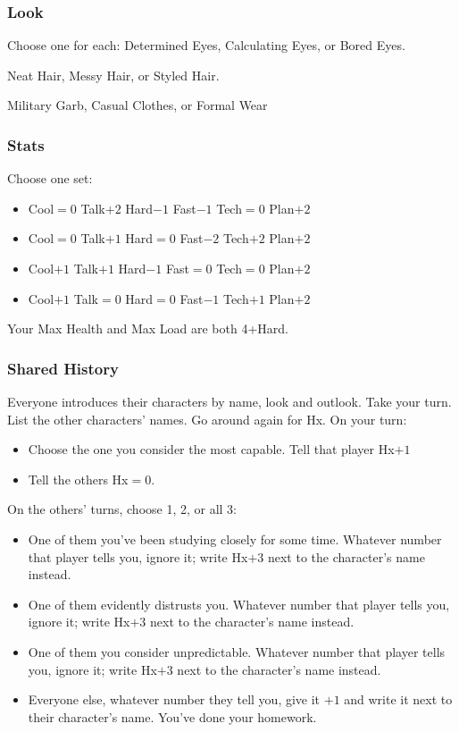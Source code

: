 \subsubsection{Look}
Choose one for each:
Determined Eyes, Calculating Eyes, or Bored Eyes.

Neat Hair, Messy Hair, or Styled Hair.

Military Garb, Casual Clothes, or Formal Wear

\subsubsection{Stats}
Choose one set:
\begin{itemize}
\setlength\itemsep{0em}
\item Cool${=}0$ Talk$+2$ Hard$-1$ Fast$-1$ Tech${=}0$ Plan$+2$
\item Cool${=}0$ Talk$+1$ Hard${=}0$ Fast$-2$ Tech$+2$ Plan$+2$
\item Cool$+1$ Talk$+1$ Hard$-1$ Fast${=}0$ Tech${=}0$ Plan$+2$
\item Cool$+1$ Talk${=}0$ Hard${=}0$ Fast$-1$ Tech$+1$ Plan$+2$
\end{itemize}
Your Max Health and Max Load are both 4+Hard.

\subsubsection{Shared History}
Everyone introduces their characters by name, look and outlook. Take
your turn. List the other characters' names. Go around again for
Hx. On your turn:
\begin{itemize} %
\item Choose the one you consider the most capable. Tell that player Hx$+1$
\item Tell the others Hx${=}0$.
\end{itemize}
On the others’ turns, choose 1, 2, or all 3:
\begin{itemize} %
\item One of them you've been studying closely for some time. Whatever
  number that player tells you, ignore it; write Hx$+3$ next to the
  character’s name instead.
\item One of them evidently distrusts you. Whatever number that player
  tells you, ignore it; write Hx$+3$ next to the character’s name
  instead.
\item One of them you consider unpredictable. Whatever number that
  player tells you, ignore it; write Hx$+3$ next to the character’s name
  instead.
\item Everyone else, whatever number they tell you, give it $+1$ and
  write it next to their character’s name. You've done your homework.
\end{itemize}

